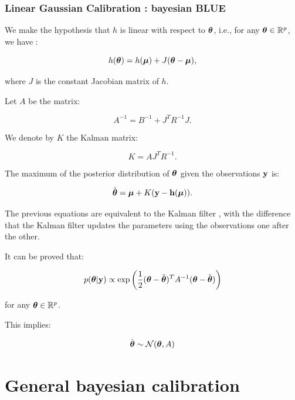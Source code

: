\documentclass{beamer}
\begin{document}
\begin{frame}
\frametitle{Linear Gaussian Calibration : bayesian BLUE}
We make the hypothesis that $h$ is linear with respect to
$\boldsymbol{\theta}$, i.e., for any
$\boldsymbol{\theta}\in\mathbb{R}^p$, we have :

$$
h(\boldsymbol{\theta}) = h(\boldsymbol{\mu}) + J(\boldsymbol{\theta}-\boldsymbol{\mu} ),
$$

where $J$ is the constant Jacobian matrix of $h$.

Let $A$ be the matrix:

$$
A^{-1} = B^{-1} + J^T R^{-1} J.
$$

We denote by $K$ the Kalman matrix:

$$
K = A J^T R^{-1}.
$$

The maximum of the posterior distribution of $\boldsymbol{\theta}$ given
the observations ${\bf y}$ is:

$$
\hat{\boldsymbol{\theta}} = \boldsymbol{\mu} + K ({\bf y} - {\bf h}(\boldsymbol{\mu})).
$$

\end{frame}

\begin{frame}

The previous equations are equivalent to the Kalman filter \cite{Asch2016}, 
with the difference that the Kalman filter updates the parameters using 
the observations one after the other.

It can be proved that:

$$
   p(\boldsymbol{\theta} | {\bf y}) \propto 
   \exp\left(\frac{1}{2} (\boldsymbol{\theta} - \hat{\boldsymbol{\theta}})^T A^{-1} (\boldsymbol{\theta} - \hat{\boldsymbol{\theta}}) \right)
$$

for any $\boldsymbol{\theta}\in\mathbb{R}^p$.

This implies:

$$
\hat{\boldsymbol{\theta}} \sim \mathcal{N}(\boldsymbol{\theta},A)
$$
\end{frame}

\section{General bayesian calibration}

\end{document}
